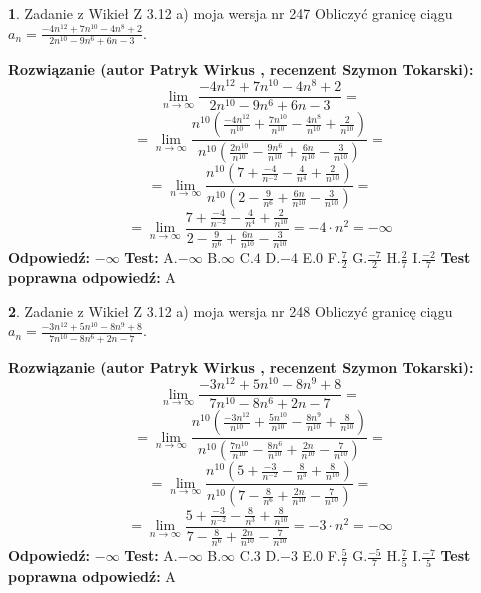 \documentclass[12pt, a4paper]{article}
\theoremstyle{definition} %
\newtheorem{zad}{}
\newcommand{\zadStart}[1]{\begin{zad}#1\newline}
\newcommand{\zadStop}{\end{zad}}
\newcommand{\rozwStart}[2]{\noindent \textbf{Rozwiązanie (autor #1 , recenzent #2): }\newline}
\newcommand{\rozwStop}{\newline}
\newcommand{\odpStart}{\noindent \textbf{Odpowiedź:}\newline}
\newcommand{\odpStop}{\newline}
\newcommand{\testStart}{\noindent \textbf{Test:}\newline}
\newcommand{\testStop}{\newline}
\newcommand{\kluczStart}{\noindent \textbf{Test poprawna odpowiedź:}\newline}
\newcommand{\kluczStop}{\newline}
\begin{document}
\zadStart{Zadanie z Wikieł Z 3.12 a) moja wersja nr 247}
Obliczyć granicę ciągu $a_{n}=\frac{-4n^{12}+7n^{10}-4n^{8}+2}{2n^{10}-9n^{6}+6n-3}$.
\zadStop
\rozwStart{Patryk Wirkus}{Szymon Tokarski}
$$\lim\limits_{n\to\infty}\frac{-4n^{12}+7n^{10}-4n^{8}+2}{2n^{10}-9n^{6}+6n-3}=$$
$$=\lim\limits_{n\to\infty}\frac{n^{10}\left(\frac{-4n^{12}}{n^{10}}+\frac{7n^{10}}{n^{10}}-\frac{4n^{8}}{n^{10}}+\frac{2}{n^{10}}\right)}{n^{10}\left(\frac{2n^{10}}{n^{10}}-\frac{9n^{6}}{n^{10}}+\frac{6n}{n^{10}}-\frac{3}{n^{10}}\right)}=$$
$$=\lim\limits_{n\to\infty}\frac{n^{10}\left(7+\frac{-4}{n^{-2}}-\frac{4}{n^{4}}+\frac{2}{n^{10}}\right)}
{n^{10}\left(2-\frac{9}{n^{6}}+\frac{6n}{n^{10}}-\frac{3}{n^{10}}\right)}=$$
$$=\lim\limits_{n\to\infty}\frac{7+\frac{-4}{n^{-2}}-\frac{4}{n^{4}}+\frac{2}{n^{10}}}{2-\frac{9}{n^{6}}+\frac{6n}{n^{10}}-\frac{3}{n^{10}}}=-4\cdot n^{2} = -\infty$$
\rozwStop
\odpStart
$-\infty$
\odpStop
\testStart
A.$-\infty$
B.$\infty$
C.$4$
D.$-4$
E.$0$
F.$\frac{7}{2}$
G.$\frac{-7}{2}$
H.$\frac{2}{7}$
I.$\frac{-2}{7}$
\testStop
\kluczStart
A
\kluczStop



\zadStart{Zadanie z Wikieł Z 3.12 a) moja wersja nr 248}
Obliczyć granicę ciągu $a_{n}=\frac{-3n^{12}+5n^{10}-8n^{9}+8}{7n^{10}-8n^{6}+2n-7}$.
\zadStop
\rozwStart{Patryk Wirkus}{Szymon Tokarski}
$$\lim\limits_{n\to\infty}\frac{-3n^{12}+5n^{10}-8n^{9}+8}{7n^{10}-8n^{6}+2n-7}=$$
$$=\lim\limits_{n\to\infty}\frac{n^{10}\left(\frac{-3n^{12}}{n^{10}}+\frac{5n^{10}}{n^{10}}-\frac{8n^{9}}{n^{10}}+\frac{8}{n^{10}}\right)}{n^{10}\left(\frac{7n^{10}}{n^{10}}-\frac{8n^{6}}{n^{10}}+\frac{2n}{n^{10}}-\frac{7}{n^{10}}\right)}=$$
$$=\lim\limits_{n\to\infty}\frac{n^{10}\left(5+\frac{-3}{n^{-2}}-\frac{8}{n^{3}}+\frac{8}{n^{10}}\right)}
{n^{10}\left(7-\frac{8}{n^{6}}+\frac{2n}{n^{10}}-\frac{7}{n^{10}}\right)}=$$
$$=\lim\limits_{n\to\infty}\frac{5+\frac{-3}{n^{-2}}-\frac{8}{n^{3}}+\frac{8}{n^{10}}}{7-\frac{8}{n^{6}}+\frac{2n}{n^{10}}-\frac{7}{n^{10}}}=-3\cdot n^{2} = -\infty$$
\rozwStop
\odpStart
$-\infty$
\odpStop
\testStart
A.$-\infty$
B.$\infty$
C.$3$
D.$-3$
E.$0$
F.$\frac{5}{7}$
G.$\frac{-5}{7}$
H.$\frac{7}{5}$
I.$\frac{-7}{5}$
\testStop
\kluczStart
A
\kluczStop
\end{document}

